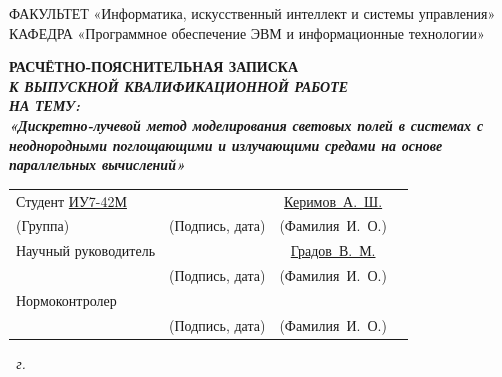 \begin{FixLineStretch}[1.25]
\begin{titlepage}
	{\doublespacing\small\raggedright
		ФАКУЛЬТЕТ \hspace{4mm} «Информатика, искусственный интеллект и системы управления» \\
		КАФЕДРА \hspace{9mm} «Программное обеспечение ЭВМ и информационные технологии» \\
	}

	\vspace{20mm}

	{\large\bfseries
		РАСЧЁТНО-ПОЯСНИТЕЛЬНАЯ ЗАПИСКА \\
		{\itshape
			К ВЫПУСКНОЙ КВАЛИФИКАЦИОННОЙ РАБОТЕ \\
			НА ТЕМУ: \\
			«Дискретно-лучевой метод моделирования световых полей в системах с неоднородными поглощающими и излучающими средами на основе параллельных вычислений»
		}
	}

	\vspace{40mm}

	\begin{tabular}{p{} c c c}
		Студент \underline{ИУ7-42М}            & \underline{\hspace{35mm}}     & \underline{Керимов~А.~Ш.}     \\ [-0.6em]
		{\hspace{23.5mm} \scriptsize (Группа)} & {\scriptsize (Подпись, дата)} & {\scriptsize (Фамилия~И.~О.)} \\
		Научный руководитель                   & \underline{\hspace{35mm}}     & \underline{Градов~В.~М.}      \\ [-0.6em]
		                                       & {\scriptsize (Подпись, дата)} & {\scriptsize (Фамилия~И.~О.)} \\
		Нормоконтролер                         & \underline{\hspace{35mm}}     & \underline{}                  \\ [-0.6em]
		                                       & {\scriptsize (Подпись, дата)} & {\scriptsize (Фамилия~И.~О.)} \\
	\end{tabular}

	\vfill

	\textit{{\the\year}~г.}
	\renewcommand\baselinestretch{1.425}\selectfont
\end{titlepage}
\end{FixLineStretch}

\setcounter{page}{5}
